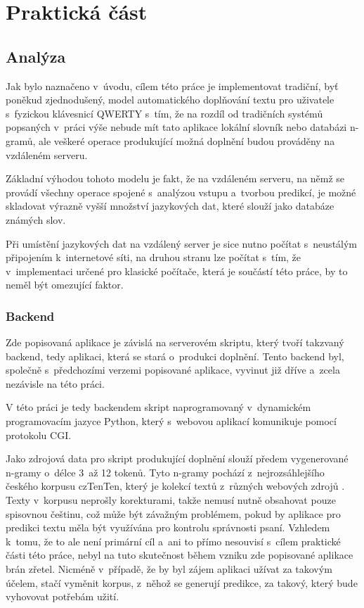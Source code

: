 \documentclass[a4paper,11pt,openany]{book} %
\begin{document}
\part{Praktická část}

\chapter{Analýza}

Jak bylo naznačeno v~úvodu, cílem této práce je implementovat tradiční, byť poněkud zjednodušený, model automatického doplňování textu pro uživatele s~fyzickou klávesnicí QWERTY s~tím, že na rozdíl od tradičních systémů popsaných v~práci výše nebude mít tato aplikace lokální slovník nebo databázi n-gramů, ale veškeré operace produkující možná doplnění budou prováděny na vzdáleném serveru.

Základní výhodou tohoto modelu je fakt, že na vzdáleném serveru, na němž se provádí všechny operace spojené s~analýzou vstupu a~tvorbou predikcí, je možné skladovat výrazně vyšší množství jazykových dat, které slouží jako databáze známých slov.

Při umístění jazykových dat na vzdálený server je sice nutno počítat s~neustálým připojením k~internetové síti, na druhou stranu lze počítat s~tím, že v~implementaci určené pro klasické počítače, která je součástí této práce, by to neměl být omezující faktor. 

\section{Backend}

Zde popisovaná aplikace je závislá na serverovém skriptu, který tvoří takzvaný backend, tedy aplikaci, která se stará o~produkci doplnění. Tento backend byl, společně s~předchozími verzemi popisované aplikace, vyvinut již dříve a~zcela nezávisle na této práci. \parencite{neverilovaulipova2014}

V této práci je tedy backendem skript naprogramovaný v~dynamickém programovacím jazyce Python, který s~webovou aplikací komunikuje pomocí protokolu CGI. 

Jako zdrojová data pro skript produkující doplnění slouží předem vygenerované \mbox{n-gramy} o~délce 3~až 12 tokenů. Tyto n-gramy pochází z~nejrozsáhlejšího českého korpusu czTenTen, který je kolekcí textů z~různých webových zdrojů \parencite{suchomel2012}. Texty v~korpusu neprošly korekturami, takže nemusí nutně obsahovat pouze spisovnou češtinu, což může být závažným problémem, pokud by aplikace pro predikci textu měla být využívána pro kontrolu správnosti psaní. Vzhledem k~tomu, že to ale není primární cíl a~ani to přímo nesouvisí s~cílem praktické části této práce, nebyl na tuto skutečnost během vzniku zde popisované aplikace brán zřetel. Nicméně v~případě, že by byl zájem aplikaci užívat za takovým účelem, stačí vyměnit korpus, z~něhož se generují predikce, za takový, který bude vyhovovat potřebám užití.
\end{document}
